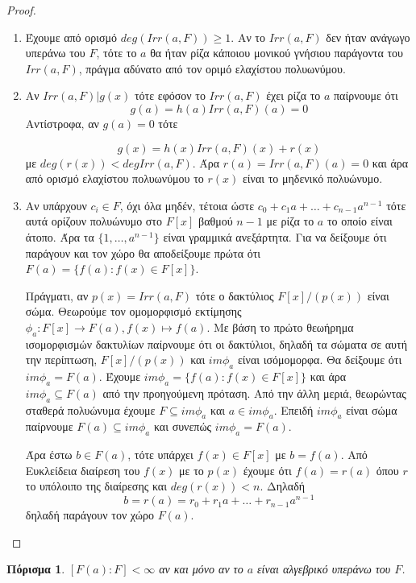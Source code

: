 \documentclass[oneside,a4paper]{article}
\newtheorem{cor}{Πόρισμα}
\begin{document}
\begin{proof} $ $

	\begin{enumerate}
	\item Έχουμε από ορισμό $deg(Irr(a,F))\geq 1$. Αν το $Irr(a,F)$ δεν ήταν ανάγωγο υπεράνω του $F$, τότε το $a$ θα ήταν ρίζα κάποιου μονικού γνήσιου παράγοντα του $Irr(a,F)$, πράγμα αδύνατο από τον οριμό ελαχίστου πολυωνύμου.
	\item Αν $Irr(a,F) | g(x)$ τότε εφόσον το $Irr(a,F)$ έχει ρίζα το $a$ παίρνουμε ότι 
	$$g(a) = h(a)Irr(a,F)(a) = 0$$ 
	Αντίστροφα, αν $g(a) = 0$ τότε 

	$$g(x) = h(x) Irr(a,F)(x) + r(x)$$
	με $deg(r(x)) < deg Irr(a,F)$. Άρα $r(a) = Irr(a,F)(a) = 0$ και άρα από ορισμό ελαχίστου πολυωνύμου το $r(x)$ είναι το μηδενικό πολυώνυμο.
	\item Αν υπάρχουν $c_i \in F$, όχι όλα μηδέν, τέτοια ώστε $c_0 + c_1 a + \ldots + c_{n-1} a^{n-1}$ τότε αυτά ορίζουν πολυώνυμο στο $F[x]$ βαθμού $n-1$ με ρίζα το $a$ το οποίο είναι άτοπο. Άρα τα $\{1,\ldots,a^{n-1}\}$ είναι γραμμικά ανεξάρτητα. Για να δείξουμε ότι παράγουν και τον χώρο θα αποδείξουμε πρώτα ότι $F(a) = \{f(a): f(x) \in F[x]\}$.
	
	Πράγματι, αν $p(x) = Irr(a,F)$ τότε ο δακτύλιος $F[x]/(p(x))$ είναι σώμα. Θεωρούμε τον ομομορφισμό εκτίμησης $\phi_a : F[x] \rightarrow F(a), f(x) \mapsto f(a)$. Με βάση το πρώτο θεωήρημα ισομορφισμών δακτυλίων παίρνουμε ότι οι δακτύλιοι, δηλαδή τα σώματα σε αυτή την περίπτωση, $F[x]/(p(x))$ και $im\phi_a$ είναι ισόμομορφα. Θα δείξουμε ότι $im\phi_a = F(a)$. Έχουμε $im\phi_a = \{f(a) : f(x) \in F[x]\}$ και άρα $im\phi_a \subseteq F(a)$ από την προηγούμενη πρόταση. Από την άλλη μεριά, θεωρώντας σταθερά πολυώνυμα έχουμε $F \subseteq im\phi_a$ και $a\in im\phi_a$. Επειδή $im\phi_a$ είναι σώμα παίρνουμε $F(a) \subseteq im\phi_a$ και συνεπώς $im\phi_a = F(a)$.

	Άρα έστω $b \in F(a)$, τότε υπάρχει $f(x) \in F[x]$ με $b=f(a)$. Από Ευκλείδεια διαίρεση του $f(x)$ με το $p(x)$ έχουμε ότι $f(a) = r(a)$ όπου $r$ το υπόλοιπο της διαίρεσης και $deg(r(x)) < n$. Δηλαδή
	$$b = r(a) = r_0 + r_1 a + \ldots + r_{n-1} a^{n-1}$$
	δηλαδή παράγουν τον χώρο $F(a)$.
	\end{enumerate}
\end{proof}
\vspace{0.1cm}
\begin{cor}  $[F(a): F] < \infty$ αν και μόνο αν το $a$ είναι αλγεβρικό υπεράνω του $F$.
\end{cor}
\end{document}
